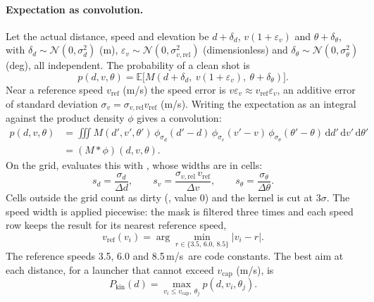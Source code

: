 \paragraph{Expectation as convolution.}
Let the actual distance, speed and elevation be $d+\delta_d$, $v(1+\varepsilon_v)$ and
$\theta+\delta_\theta$, with $\delta_d\sim\mathcal N(0,\sigma_d^2)$ (\unit{m}),
$\varepsilon_v\sim\mathcal N(0,\sigma_{v,\mathrm{rel}}^2)$ (dimensionless) and
$\delta_\theta\sim\mathcal N(0,\sigma_\theta^2)$ (\unit{deg}), all independent.
The probability of a clean shot is
\begin{equation}
  p(d,v,\theta) = \mathbb E\big[M(d+\delta_d,\ v(1+\varepsilon_v),\ \theta+\delta_\theta)\big].
  \label{eq:robust_spec-expect}
\end{equation}
Near a reference speed $v_{\mathrm{ref}}$ (\unit{m/s}) the speed error is
$v\varepsilon_v\approx v_{\mathrm{ref}}\varepsilon_v$, an additive error of standard deviation
$\sigma_v = \sigma_{v,\mathrm{rel}}v_{\mathrm{ref}}$ (\unit{m/s}).
Writing the expectation as an integral against the product density $\phi$ gives a convolution:
\begin{equation}
  \begin{split}
  p(d,v,\theta) &= \iiint M(d',v',\theta')\,
  \phi_{\sigma_d}(d'-d)\,\phi_{\sigma_v}(v'-v)\,\phi_{\sigma_\theta}(\theta'-\theta)\,
  \mathrm dd'\,\mathrm dv'\,\mathrm d\theta'\\
  &= (M*\phi)(d,v,\theta).
  \end{split}
  \label{eq:robust_spec-conv}
\end{equation}
On the grid,  evaluates this with , whose
widths are in cells:
\begin{equation}
  s_d = \frac{\sigma_d}{\Delta d},\qquad s_v = \frac{\sigma_{v,\mathrm{rel}}\,v_{\mathrm{ref}}}{\Delta v},\qquad
  s_\theta = \frac{\sigma_\theta}{\Delta\theta}.
  \label{eq:robust_spec-sigcells}
\end{equation}
Cells outside the grid count as dirty (, value 0) and the kernel is cut at
$3\sigma$.
The speed width is applied piecewise: the mask is filtered three times and each speed row keeps the
result for its nearest reference speed,
\begin{equation}
  v_{\mathrm{ref}}(v_i) = \arg\min_{r\in\{3.5,\,6.0,\,8.5\}} |v_i-r| .
  \label{eq:robust_spec-vref}
\end{equation}
The reference speeds 3.5, 6.0 and 8.5\,\unit{m/s}\assumed\ are code constants.
The best aim at each distance, for a launcher that cannot exceed $v_{\mathrm{cap}}$ (\unit{m/s}), is
\begin{equation}
  P_{\mathrm{kin}}(d) = \max_{v_i\le v_{\mathrm{cap}},\ \theta_j} p(d,v_i,\theta_j).
  \label{eq:robust_spec-pkin}
\end{equation}

